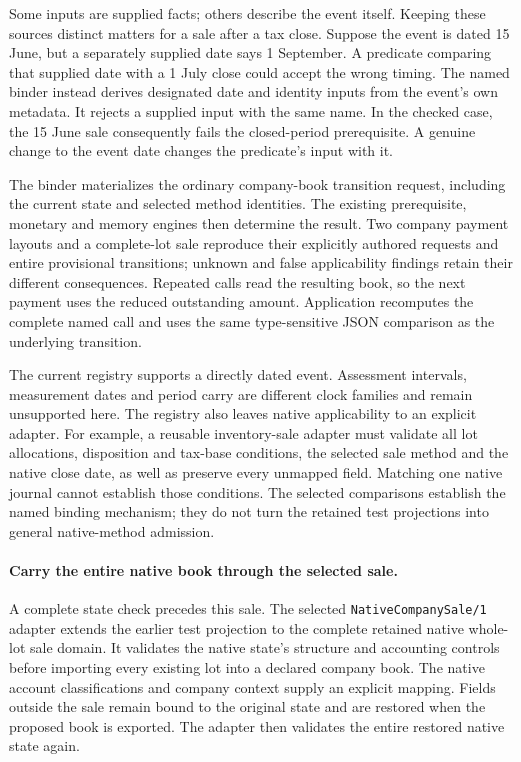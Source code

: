 Some inputs are supplied facts; others describe the event itself. Keeping these
sources distinct matters for a sale after a tax close. Suppose the event is dated
15 June, but a separately supplied date says 1 September. A predicate comparing
that supplied date with a 1 July close could accept the wrong timing. The named
binder instead derives designated date and identity inputs from the event's own
metadata. It rejects a supplied input with the same name. In the checked case,
the 15 June sale consequently fails the closed-period prerequisite. A genuine
change to the event date changes the predicate's input with it.

The binder materializes the ordinary company-book transition request, including
the current state and selected method identities. The existing prerequisite,
monetary and memory engines then determine the result. Two company payment layouts
and a complete-lot sale reproduce their explicitly authored requests and entire
provisional transitions; unknown and false applicability findings retain their
different consequences. Repeated calls read the resulting book, so the next
payment uses the reduced outstanding amount. Application recomputes the complete
named call and uses the same type-sensitive JSON comparison as the underlying
transition.

The current registry supports a directly dated event. Assessment intervals,
measurement dates and period carry are different clock families and remain
unsupported here. The registry also leaves native applicability to an explicit
adapter. For example, a reusable inventory-sale adapter must validate all lot
allocations, disposition and tax-base conditions, the selected sale method and the
native close date, as well as preserve every unmapped field. Matching one native
journal cannot establish those conditions. The selected comparisons establish the
named binding mechanism; they do not turn the retained test projections into
general native-method admission.

\paragraph{Carry the entire native book through the selected sale.}
A complete state check precedes this sale. The selected
\texttt{NativeCompanySale/1} adapter extends the earlier test projection to the complete retained native whole-lot sale domain. It validates
the native state's structure and accounting controls before importing every
existing lot into a declared company book. The native account classifications
and company context supply an explicit mapping. Fields outside the sale remain
bound to the original state and are restored when the proposed book is exported.
The adapter then validates the entire restored native state again.

